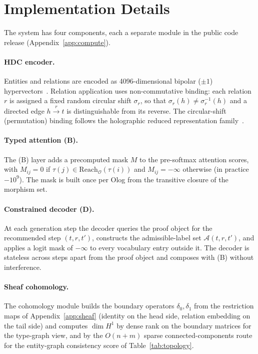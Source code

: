 \section{Implementation Details}
\label{app:impl}

The system has four components, each a separate module in the public
code release (Appendix~\ref{app:compute}).

\paragraph{HDC encoder.} Entities and relations are encoded as
4096-dimensional bipolar ($\pm 1$) hypervectors~\cite{kanerva2009hdc}.
Relation application uses non-commutative binding: each relation $r$ is
assigned a fixed random circular shift $\sigma_r$, so that $\sigma_r(h)
\neq \sigma_r^{-1}(h)$ and a directed edge $h \xrightarrow{r} t$ is
distinguishable from its reverse. The circular-shift (permutation)
binding follows the holographic reduced representation
family~\cite{plate1995hrr}.

\paragraph{Typed attention (B).} The (B) layer adds a precomputed mask
$M$ to the pre-softmax attention scores, with $M_{ij} = 0$ if
$\tau(j) \in \mathrm{Reach}_\mathcal{O}(\tau(i))$ and $M_{ij} = -\infty$
otherwise (in practice $-10^9$). The mask is built once per Olog from the
transitive closure of the morphism set.

\paragraph{Constrained decoder (D).} At each generation step the decoder
queries the proof object for the recommended step $(t, r, t')$,
constructs the admissible-label set $\mathcal{A}(t, r, t')$, and applies
a logit mask of $-\infty$ to every vocabulary entry outside it. The
decoder is stateless across steps apart from the proof object and
composes with (B) without interference.

\paragraph{Sheaf cohomology.} The cohomology module builds the boundary
operators $\delta_0, \delta_1$ from the restriction maps of
Appendix~\ref{app:sheaf} (identity on the head side, relation embedding
on the tail side) and computes $\dim H^1$ by dense rank on the boundary
matrices for the type-graph view, and by the $O(n+m)$ sparse
connected-components route for the entity-graph consistency score of
Table~\ref{tab:topology}.

